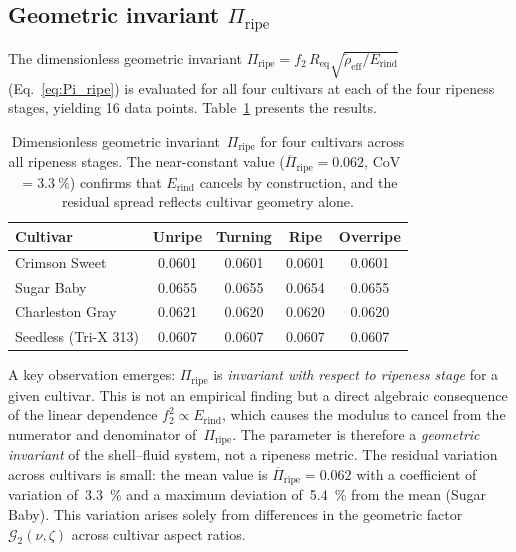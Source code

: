 \subsection{Geometric invariant $\Pi_{\mathrm{ripe}}$}
\label{sec:universal_curve}

The dimensionless geometric invariant
$\Pi_{\mathrm{ripe}} = f_2 \, R_{\mathrm{eq}} \sqrt{\tilde{\rho}_{\mathrm{eff}} / E_{\mathrm{rind}}}$
(Eq.~\ref{eq:Pi_ripe}) is evaluated for all four cultivars at each of
the four ripeness stages, yielding 16 data points.
Table~\ref{tab:Pi_ripe} presents the results.

\begin{table}[t]
  \centering
  \caption{Dimensionless geometric invariant~$\Pi_{\mathrm{ripe}}$ for
    four cultivars across all ripeness stages.  The near-constant value
    ($\overline{\Pi}_{\mathrm{ripe}} = 0.062$, CoV~$= \SI{3.3}{\percent}$)
    confirms that $E_{\mathrm{rind}}$ cancels by construction, and
    the residual spread reflects cultivar geometry alone.}
  \label{tab:Pi_ripe}
  \begin{tabular}{lcccc}
    \toprule
    Cultivar & Unripe & Turning & Ripe & Overripe \\
    \midrule
    Crimson Sweet      & 0.0601 & 0.0601 & 0.0601 & 0.0601 \\
    Sugar Baby         & 0.0655 & 0.0655 & 0.0654 & 0.0655 \\
    Charleston Gray    & 0.0621 & 0.0620 & 0.0620 & 0.0620 \\
    Seedless (Tri-X 313) & 0.0607 & 0.0607 & 0.0607 & 0.0607 \\
    \bottomrule
  \end{tabular}
\end{table}

\noindent
A key observation emerges: $\Pi_{\mathrm{ripe}}$ is \emph{invariant
with respect to ripeness stage} for a given cultivar.  This is not an
empirical finding but a direct algebraic consequence of the linear dependence $f_2^2 \propto
E_{\mathrm{rind}}$, which causes the modulus
to cancel from the numerator and denominator
of~$\Pi_{\mathrm{ripe}}$.  The parameter is therefore a \emph{geometric
invariant} of the shell--fluid system, not a ripeness metric.  The
residual variation across
cultivars is small: the mean value is
$\overline{\Pi}_{\mathrm{ripe}} = 0.062$ with a coefficient of
variation of~\SI{3.3}{\percent} and a maximum deviation
of~\SI{5.4}{\percent} from the mean (Sugar Baby).  This variation
arises solely from differences in the geometric factor
$\mathcal{G}_2(\nu, \zeta)$ across cultivar aspect ratios.

